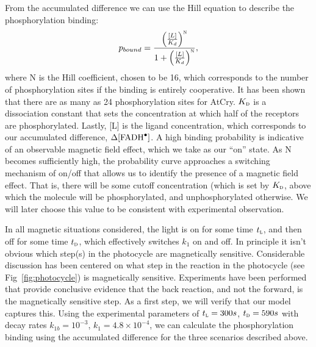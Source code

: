\documentclass[twoside,twocolumn,9pt]{article}
\begin{document}
From the accumulated difference we can use the Hill equation to describe the phosphorylation binding: \cite{Phillips2009}
\begin{equation}
	p_{bound} = \frac{\left( \frac{[L]}{K_{d}} \right)^{\textsc{n}}}{1 + \left( \frac{[L]}{K_{d}} \right)^{\textsc{n}}},
	\label{eq:phosph}
\end{equation}
where N is the Hill coefficient, chosen to be 16, which corresponds to the number of phosphorylation sites if the binding is 
entirely cooperative. \cite{Phillips2009} It has been shown \cite{Liu2017} that there are as many as 24 phosphorylation sites for 
AtCry. $K_{\textsc{d}}$ is a dissociation constant that sets the concentration at which half of the receptors are phosphorylated. 
Lastly, [L] is the ligand concentration, which corresponds to our accumulated difference, $\Delta [\ce{FADH^{.}}]$. A high binding 
probability is indicative of an observable magnetic field effect, which we take as our ``on'' state. 
As N becomes sufficiently high, the probability curve approaches a switching mechanism of on/off that allows us to identify the 
presence of a magnetic field effect. That is, there will be some cutoff concentration (which is set by $K_{\textsc{d}}$, above 
which the molecule will be phosphorylated, and unphosphorylated otherwise. We will later choose this value to be consistent with 
experimental observation.

In all magnetic situations considered, the light is on for some time $t_{\textsc{l}}$, and then off for some time $t_{\textsc{d}}$, 
which effectively switches $k_{1}$ on and off. In principle it isn't obvious which step(s) in the photocycle are magnetically 
sensitive. Considerable discussion has been centered on what step in the reaction in the photocycle (see Fig~\ref{fig:photocycle}) 
is magnetically sensitive. Experiments have been performed that provide conclusive evidence that the back reaction, and not the 
forward, is the magnetically sensitive step. As a first step, we will verify that our model captures this. Using the experimental 
parameters \cite{Pooam2019} of $t_{\textsc{l}} = 300s$, $t_{\textsc{d}} = 590s$ with decay rates $k_{1b} = 10^{-3}$, $k_{1} = 4.8 
\times 10^{-4}$, \cite{Procopio2016} we can calculate the phosphorylation binding using the accumulated difference for the three 
scenarios described above.
\end{document}
